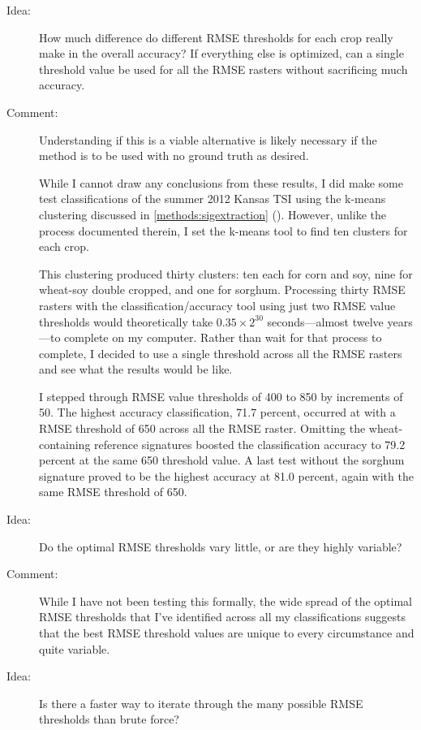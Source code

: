 \begin{description}
\item[Idea:] How much difference do different RMSE thresholds for each crop really make in the overall accuracy? If everything else is optimized, can a single threshold value be used for all the RMSE rasters without sacrificing much accuracy.

\item[Comment:] Understanding if this is a viable alternative is likely necessary if the method is to be used with no ground truth as desired.

While I cannot draw any conclusions from these results, I did make some test classifications of the summer 2012 Kansas TSI using the k-means clustering discussed in \autoref{methods:sigextraction} (). However, unlike the process documented therein, I set the k-means tool to find ten clusters for each crop.

This clustering produced thirty clusters: ten each for corn and soy, nine for wheat-soy double cropped, and one for sorghum. Processing thirty RMSE rasters with the classification/accuracy tool using just two RMSE value thresholds would theoretically take $0.35\times2^{30}$ seconds---almost twelve years---to complete on my computer. Rather than wait for that process to complete, I decided to use a single threshold across all the RMSE rasters and see what the results would be like.

I stepped through RMSE value thresholds of 400 to 850 by increments of 50. The highest accuracy classification, 71.7 percent, occurred at with a RMSE threshold of 650 across all the RMSE raster. Omitting the wheat-containing reference signatures boosted the classification accuracy to 79.2 percent at the same 650 threshold value. A last test without the sorghum signature proved to be the highest accuracy at 81.0 percent, again with the same RMSE threshold of 650.

\item[Idea:] Do the optimal RMSE thresholds vary little, or are they highly variable?

\item[Comment:] While I have not been testing this formally, the wide spread of the optimal RMSE thresholds that I’ve identified across all my classifications suggests that the best RMSE threshold values are unique to every circumstance and quite variable.

\item[Idea:] Is there a faster way to iterate through the many possible RMSE thresholds than brute force?


\end{description}
